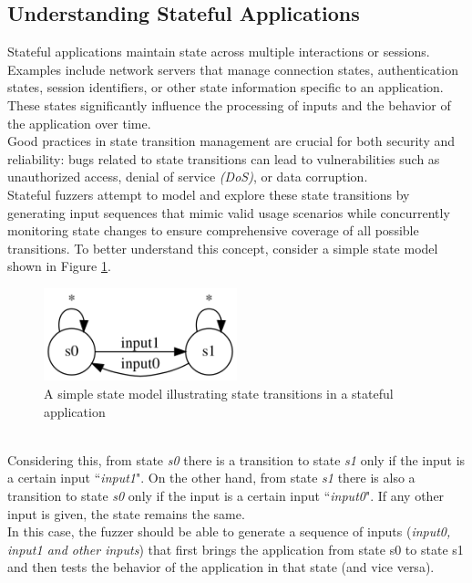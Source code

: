 \subsection{Understanding Stateful Applications}
Stateful applications maintain state across multiple interactions or sessions. Examples include network servers that manage connection states, authentication states, session identifiers, or other state information specific to an application. These states significantly influence the processing of inputs and the behavior of the application over time.
\\Good practices in state transition management are crucial for both security and reliability: bugs related to state transitions can lead to vulnerabilities such as unauthorized access, denial of service \textit{(DoS)}, or data corruption. 
\\Stateful fuzzers attempt to model and explore these state transitions by generating input sequences that mimic valid usage scenarios while concurrently monitoring state changes to ensure comprehensive coverage of all possible transitions. To better understand this concept, consider a simple state model shown in Figure \ref{fig:simplestatemodel}.
\begin{figure}[H]
    \centering
    \includegraphics[width=0.5\textwidth]{Images/simplestatemodel.png}
    \caption{A simple state model illustrating state transitions in a stateful application}
    \label{fig:simplestatemodel}
\end{figure}
\phantom{}\\
Considering this, from state \textit{s0} there is a transition to state \textit{s1} only if the input is a certain input ``\textit{input1}". On the other hand, from state \textit{s1} there is also a transition to state \textit{s0} only if the input is a certain input ``\textit{input0}". If any other input is given, the state remains the same.
\\In this case, the fuzzer should be able to generate a sequence of inputs (\textit{input0, input1 and other inputs}) that first brings the application from state s0 to state s1 and then tests the behavior of the application in that state (and vice versa).

